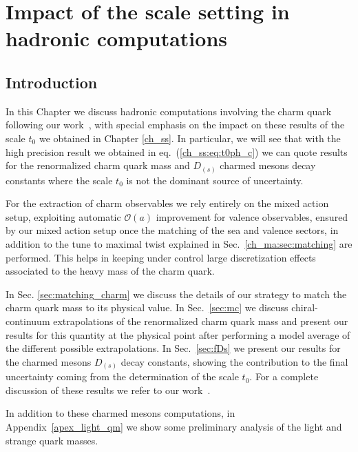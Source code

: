 \chapter{Impact of the scale setting in hadronic computations}
\label{ch_charm}


\section{Introduction}
\label{ch_qm:sec:introduction}

In this Chapter we discuss hadronic computations involving the charm quark following our work~\citep{charm}, with special emphasis on the impact on these results of the scale $t_0$ we obtained in Chapter \ref{ch_ss}. In particular, we will see that with the high precision result we obtained in eq.~(\ref{ch_ss:eq:t0ph_c}) we can quote results for the renormalized charm quark mass and $D_{(s)}$ charmed mesons decay constants where the scale $t_0$ is not the dominant source of uncertainty. 

For the extraction of charm observables we rely entirely on the mixed action setup, exploiting automatic $\mathcal{O}(a)$ improvement for valence observables, ensured by our mixed action setup once the matching of the sea and valence sectors, in addition to the tune to maximal twist explained in Sec.~\ref{ch_ma:sec:matching} are performed. This helps in keeping under control large discretization effects associated to the heavy mass of the charm quark. 

In Sec. \ref{sec:matching_charm} we discuss the details of our strategy to match the charm quark mass to its physical value. In Sec.~\ref{sec:mc} we discuss chiral-continuum extrapolations of the renormalized charm quark mass and present our results for this quantity at the physical point after performing a model average of the different possible extrapolations. In Sec.~\ref{sec:fDs} we present our results for the charmed mesons $D_{(s)}$ decay constants, showing the contribution to the final uncertainty coming from the determination of the scale $t_0$. For a complete discussion of these results we refer to our work~\citep{charm}. 

In addition to these charmed mesons computations, in Appendix~\ref{apex_light_qm} we show some preliminary analysis of the light and strange quark masses. 


